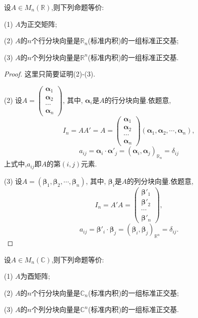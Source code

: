 \begin{theorem}
  设$A\in M_n(\mathbb{R})$,则下列命题等价:

  (1) $A$为正交矩阵;

  (2) $A$的$n$个行分块向量是$\mathbb{R}_n$(标准内积)的一组标准正交基;

  (3) $A$的$n$个列分块向量是$\mathbb{R}^n$(标准内积)的一组标准正交基.
\end{theorem}

\begin{proof}
  这里只简要证明(2)-(3).

  (2) 设$A=\begin{pmatrix} \bm{\alpha}_1\\\bm{\alpha}_2\\\cdots\\\bm{\alpha}_n\end{pmatrix}$,
    其中, $\bm{\alpha}_i$是$A$的行分块向量.依题意,
    \[
      I_n=AA'=A=\begin{pmatrix} \bm{\alpha}_1\\\bm{\alpha}_2\\\cdots\\\bm{\alpha}_n\end{pmatrix}
      (\bm{\alpha}_1,\bm{\alpha}_2,\cdots,\bm{\alpha}_n),
    \]
    \[
      a_{ij}=\bm{\alpha}_i\cdot\bm{\alpha}'_j=(\bm{\alpha}_i,\bm{\alpha}_j)_{\mathbb{R}_n}=\delta_{ij}
    \]
    上式中,$a_{ij}$即$A$的第$(i,j)$元素.

    (3) 设$A=(\bm{\beta}_1,\bm{\beta}_2,\cdots,\bm{\beta}_n)$,
    其中, $\bm{\beta}_i$是$A$的列分块向量.依题意,
    \[
      I_n=A'A=\begin{pmatrix}\bm{\beta}'_1\\\bm{\beta}'_2\\\cdots\\\bm{\beta}'_n\end{pmatrix},
    \]
    \[
      a_{ij}= \bm{\beta}'_i\cdot\bm{\beta}_j=(\bm{\beta}_i,\bm{\beta}_j)_{\mathbb{R}^n}=\delta_{ij}.
      \]
    \end{proof}

\begin{theorem}
  设$A\in M_n(\mathbb{C})$,则下列命题等价:

  (1) $A$为酉矩阵;

  (2) $A$的$n$个行分块向量是$\mathbb{C}_n$(标准内积)的一组标准正交基;

  (3) $A$的$n$个列分块向量是$\mathbb{C}^n$(标准内积)的一组标准正交基.
\end{theorem}

